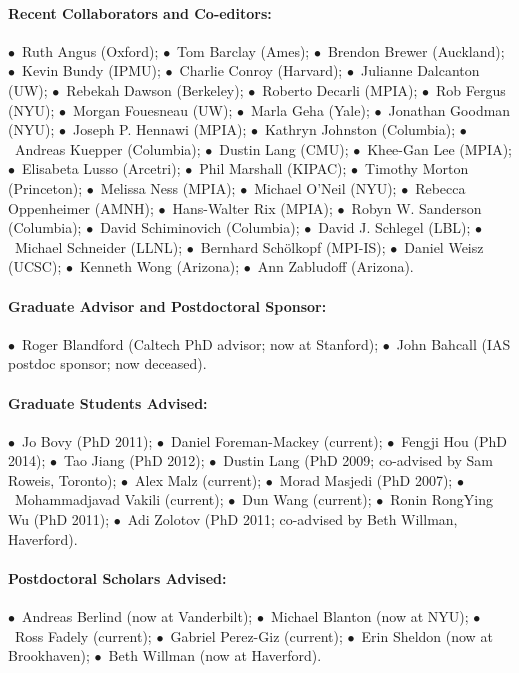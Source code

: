 \documentclass[letterpaper,12pt]{article}
\begin{document}
\paragraph{Recent Collaborators and Co-editors:}
$\bullet$~Ruth Angus (Oxford);
$\bullet$~Tom Barclay (Ames);
$\bullet$~Brendon Brewer (Auckland);
$\bullet$~Kevin Bundy (IPMU);
$\bullet$~Charlie Conroy (Harvard);
$\bullet$~Julianne Dalcanton (UW);
$\bullet$~Rebekah Dawson (Berkeley);
$\bullet$~Roberto Decarli (MPIA);
$\bullet$~Rob Fergus (NYU);
$\bullet$~Morgan Fouesneau (UW);
$\bullet$~Marla Geha (Yale);
$\bullet$~Jonathan Goodman (NYU);
$\bullet$~Joseph P. Hennawi (MPIA);
$\bullet$~Kathryn Johnston (Columbia);
$\bullet$~Andreas Kuepper (Columbia);
$\bullet$~Dustin Lang (CMU);
$\bullet$~Khee-Gan Lee (MPIA);
$\bullet$~Elisabeta Lusso (Arcetri);
$\bullet$~Phil Marshall (KIPAC);
$\bullet$~Timothy Morton (Princeton);
$\bullet$~Melissa Ness (MPIA);
$\bullet$~Michael O'Neil (NYU);
$\bullet$~Rebecca Oppenheimer (AMNH);
$\bullet$~Hans-Walter Rix (MPIA);
$\bullet$~Robyn W. Sanderson (Columbia);
$\bullet$~David Schiminovich (Columbia);
$\bullet$~David J. Schlegel (LBL);
$\bullet$~Michael Schneider (LLNL);
$\bullet$~Bernhard Sch\"olkopf (MPI-IS);
$\bullet$~Daniel Weisz (UCSC);
$\bullet$~Kenneth Wong (Arizona);
$\bullet$~Ann Zabludoff (Arizona).

\paragraph{Graduate Advisor and Postdoctoral Sponsor:}
$\bullet$~Roger Blandford (Caltech PhD advisor; now at Stanford);
$\bullet$~John Bahcall (IAS postdoc sponsor; now deceased).

\paragraph{Graduate Students Advised:}
$\bullet$~Jo Bovy (PhD 2011);
$\bullet$~Daniel Foreman-Mackey (current);
$\bullet$~Fengji Hou (PhD 2014);
$\bullet$~Tao Jiang (PhD 2012);
$\bullet$~Dustin Lang (PhD 2009; co-advised by Sam Roweis, Toronto);
$\bullet$~Alex Malz (current);
$\bullet$~Morad Masjedi (PhD 2007);
$\bullet$~Mohammadjavad Vakili (current);
$\bullet$~Dun Wang (current);
$\bullet$~Ronin RongYing Wu (PhD 2011);
$\bullet$~Adi Zolotov (PhD 2011; co-advised by Beth Willman, Haverford).

\paragraph{Postdoctoral Scholars Advised:}
$\bullet$~Andreas Berlind (now at Vanderbilt);
$\bullet$~Michael Blanton (now at NYU);
$\bullet$~Ross Fadely (current);
$\bullet$~Gabriel Perez-Giz (current);
$\bullet$~Erin Sheldon (now at Brookhaven);
$\bullet$~Beth Willman (now at Haverford).
\end{document}
